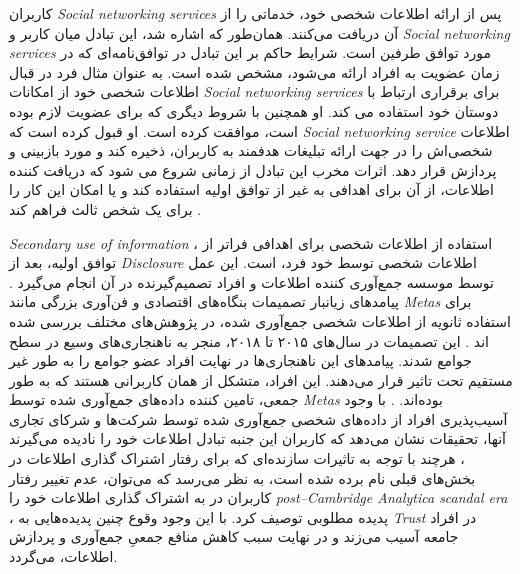 کاربران
\textit{
  \glspl{Social networking service}
}
پس از ارائه اطلاعات شخصی خود، خدماتی را از آن دریافت می‌کنند. همان‌طور که اشاره شد، این
تبادل میان کاربر و
\textit{
  \glspl{Social networking service}
}
مورد توافق طرفین است. شرایط حاکم بر این تبادل در توافق‌نامه‌ای
که در زمان عضویت به افراد ارائه می‌شود، مشخص شده است. به عنوان مثال
فرد در قبال اطلاعات شخصی خود از امکانات
\textit{
  \glspl{Social networking service}
}
برای برقراری ارتباط با دوستان خود استفاده می کند. او همچنین
با شروط دیگری که  برای عضویت لازم بوده است، موافقت کرده است. او
قبول کرده است که
\textit{
  \gls{Social networking service}
}
اطلاعات شخصی‌اش را در جهت ارائه تبلیغات هدفمند به کاربران، ذخیره کند
و مورد بازبینی و پردازش قرار دهد. اثرات مخرب این تبادل از زمانی شروع می شود که دریافت کننده اطلاعات، از
آن برای اهدافی به غیر از توافق اولیه استفاده کند و یا امکان این کار را برای یک شخص ثالث فراهم کند
.

\textit{
  \gls{Secondary use of information}
}،
استفاده از اطلاعات شخصی برای اهدافی فراتر
از توافق اولیه، بعد از
\textit{
  \gls{Disclosure}
}
اطلاعات شخصی توسط خود فرد، است. این عمل توسط موسسه جمع‌آوری کننده اطلاعات
و افراد تصمیم‌گیرنده در آن انجام می‌گیرد
.
پیامد‌های زیانبار تصمیمات بنگاه‌های اقتصادی و فن‌آوری بزرگی
مانند
\textit{
  \glspl{Meta}
}
برای استفاده ثانویه از اطلاعات شخصی جمع‌آوری شده، در پژوهش‌های مختلف بررسی شده اند
.
این تصمیمات در سال‌های ۲۰۱۵ تا ۲۰۱۸، منجر به ناهنجاری‌های وسیع در سطح جوامع شدند.
پیامدهای این ناهنجاری‌ها در نهایت افراد عضو جوامع را به طور غیر مستقیم
تحت تاثیر قرار می‌دهند. این افراد، متشکل از همان کاربرانی هستند که به طور جمعی، تامین کننده
داده‌های جمع‌آوری شده توسط
\textit{
  \glspl{Meta}
}
بوده‌اند.
.
با وجود آسیب‌پذیری افراد از داده‌های شخصی جمع‌آوری شده توسط شرکت‌ها
و شرکای تجاری آنها، تحقیقات نشان می‌دهد
که کاربران این جنبه تبادل اطلاعات خود را نادیده می‌گیرند
،
هرچند با توجه به تاثیرات سازنده‌ای که برای رفتار اشتراک گذاری اطلاعات در بخش‌های
قبلی نام برده شده است، به نظر می‌رسد که می‌توان، عدم تغییر رفتار کاربران در به اشتراک گذاری اطلاعات خود را
\textit{
  \gls{post–Cambridge Analytica scandal era}
}
، پدیده مطلوبی توصیف کرد. با این وجود وقوع چنین پدیده‌هایی به
\textit{
  \gls{Trust}
}
در افراد جامعه آسیب می‌زند و در نهایت سبب کاهش منافع جمعیِ جمع‌آوری و پردازش اطلاعات، می‌گردد.


